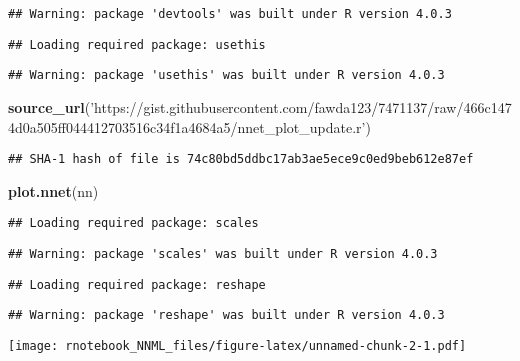 \documentclass[
]{article}
\newenvironment{Shaded}{\begin{snugshade}}{\end{snugshade}}
\newcommand{\KeywordTok}[1]{\textcolor[rgb]{0.13,0.29,0.53}{\textbf{#1}}}
\newcommand{\NormalTok}[1]{#1}
\newcommand{\OperatorTok}[1]{\textcolor[rgb]{0.81,0.36,0.00}{\textbf{#1}}}
\newcommand{\StringTok}[1]{\textcolor[rgb]{0.31,0.60,0.02}{#1}}
\begin{document}
\begin{verbatim}
## Warning: package 'devtools' was built under R version 4.0.3
\end{verbatim}

\begin{verbatim}
## Loading required package: usethis
\end{verbatim}

\begin{verbatim}
## Warning: package 'usethis' was built under R version 4.0.3
\end{verbatim}

\begin{Shaded}
\begin{Highlighting}[]
\KeywordTok{source_url}\NormalTok{(}\StringTok{'https://gist.githubusercontent.com/fawda123/7471137/raw/466c1474d0a505ff044412703516c34f1a4684a5/nnet_plot_update.r'}\NormalTok{)}
\end{Highlighting}
\end{Shaded}

\begin{verbatim}
## SHA-1 hash of file is 74c80bd5ddbc17ab3ae5ece9c0ed9beb612e87ef
\end{verbatim}

\begin{Shaded}
\begin{Highlighting}[]
\KeywordTok{plot.nnet}\NormalTok{(nn)}
\end{Highlighting}
\end{Shaded}

\begin{verbatim}
## Loading required package: scales
\end{verbatim}

\begin{verbatim}
## Warning: package 'scales' was built under R version 4.0.3
\end{verbatim}

\begin{verbatim}
## Loading required package: reshape
\end{verbatim}

\begin{verbatim}
## Warning: package 'reshape' was built under R version 4.0.3
\end{verbatim}

\texttt{[image: rnotebook\_NNML\_files/figure-latex/unnamed-chunk-2-1.pdf]}

\begin{Shaded}
\end{Shaded}
\end{document}
